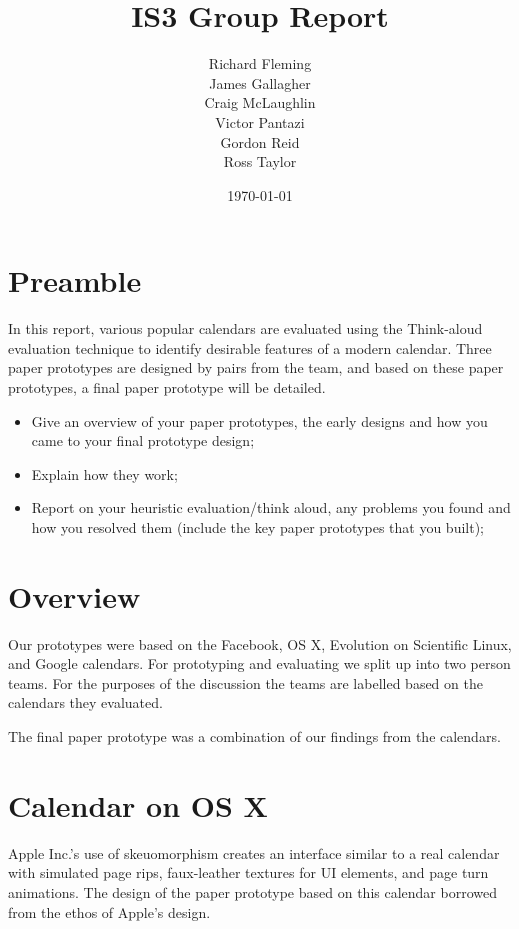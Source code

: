 \documentclass{article}
\title{IS3 Group Report}
\author{
  Richard Fleming \\
  James Gallagher \\
  Craig McLaughlin \\
  Victor Pantazi \\
  Gordon Reid \\
  Ross Taylor}
\date{\today}
\begin{document}

\maketitle


\section{Preamble}

In this report, various popular calendars are evaluated using the
Think-aloud evaluation technique to identify desirable features of a
modern calendar. Three paper prototypes are designed by pairs from the
team, and based on these paper prototypes, a final paper prototype will
be detailed.


\begin{itemize}
\item Give an overview of your paper prototypes, the early designs and
how you came to your final prototype design;

\item Explain how they work;

\item Report on your heuristic evaluation/think aloud, any problems you
found and how you resolved them (include the key paper prototypes that
you built);
\end{itemize}

\section{Overview}

Our prototypes were based on the Facebook, OS X, Evolution on Scientific
Linux, and Google calendars. For prototyping and evaluating we split up
into two person teams. For the purposes of the discussion the teams are
labelled based on the calendars they evaluated.

The final paper prototype was a combination of our findings from the
calendars.

\section{Calendar on OS X}

Apple Inc.'s use of skeuomorphism creates an interface similar to a real 
calendar with simulated page rips, faux-leather textures for UI
elements, and page turn animations. The design of the paper prototype
based on this calendar borrowed from the ethos of Apple's design.
\end{document}
